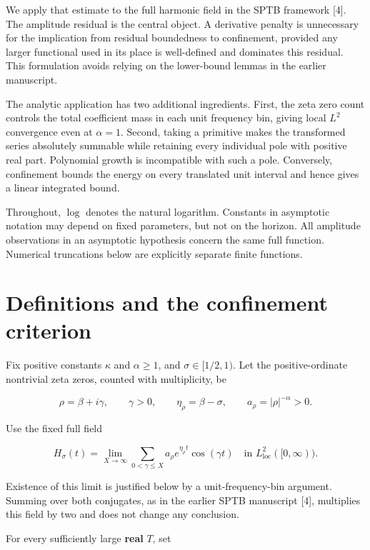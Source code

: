 \documentclass[
  11pt,
]{article}
\begin{document}
We apply that estimate to the full harmonic field in the SPTB framework
{[}4{]}. The amplitude residual is the central object. A derivative
penalty is unnecessary for the implication from residual boundedness to
confinement, provided any larger functional used in its place is
well-defined and dominates this residual. This formulation avoids
relying on the lower-bound lemmas in the earlier manuscript.

The analytic application has two additional ingredients. First, the zeta
zero count controls the total coefficient mass in each unit frequency
bin, giving local \(L^2\) convergence even at \(\alpha=1\). Second,
taking a primitive makes the transformed series absolutely summable
while retaining every individual pole with positive real part.
Polynomial growth is incompatible with such a pole. Conversely,
confinement bounds the energy on every translated unit interval and
hence gives a linear integrated bound.

Throughout, \(\log\) denotes the natural logarithm. Constants in
asymptotic notation may depend on fixed parameters, but not on the
horizon. All amplitude observations in an asymptotic hypothesis concern
the same full function. Numerical truncations below are explicitly
separate finite functions.

\hypertarget{definitions-and-the-confinement-criterion}{%
\section{Definitions and the confinement
criterion}\label{definitions-and-the-confinement-criterion}}

Fix positive constants \(\kappa\) and \(\alpha\ge1\), and
\(\sigma\in[1/2,1)\). Let the positive-ordinate nontrivial zeta zeros,
counted with multiplicity, be

\[
\rho=\beta+i\gamma,\qquad \gamma>0,
\qquad \eta_\rho=\beta-\sigma,
\qquad a_\rho=|\rho|^{-\alpha}>0.
\]

Use the fixed full field

\[
H_\sigma(t)=\lim_{X\to\infty}
\sum_{0<\gamma\le X}a_\rho e^{\eta_\rho t}\cos(\gamma t)
\quad\text{in }L^2_{\mathrm{loc}}([0,\infty)). \tag{1}
\]

Existence of this limit is justified below by a unit-frequency-bin
argument. Summing over both conjugates, as in the earlier SPTB
manuscript {[}4{]}, multiplies this field by two and does not change any
conclusion.

For every sufficiently large \textbf{real} \(T\), set
\end{document}

